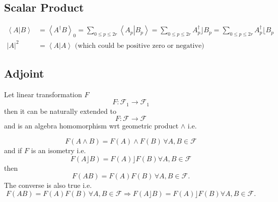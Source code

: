 \documentclass[aps,preprint]{revtex4}%
\begin{document}
\subsection{Scalar Product}%

\begin{align}
\left\langle \left.  A\right\vert B\right\rangle  &  =\left\langle A^{\dagger
}B\right\rangle _{0}=\sum_{0\leq p\leq2r}\left\langle \left.  A_{p}\right\vert
B_{p}\right\rangle =\sum_{0\leq p\leq2r}A_{p}^{\dagger}\rfloor B_{p}%
=\sum_{0\leq p\leq2r}A_{p}^{\dagger}\lfloor B_{p}\\
\left\vert A\right\vert ^{2}  &  =\left\langle \left.  A\right\vert
A\right\rangle \text{ (which could be positive zero or negative)}%
\end{align}


\subsection{Adjoint}

Let linear transformation $F$
\begin{equation}
F:\mathcal{F}_{1}\rightarrow\mathcal{F}_{1}%
\end{equation}
then it can be naturally extended to
\begin{equation}
F:\mathcal{F}\rightarrow\mathcal{F}%
\end{equation}
and is an algebra homomorphism wrt geometric product $\wedge$ i.e.%

\begin{equation}
F\left(  A\wedge B\right)  =F\left(  A\right)  \wedge F\left(  B\right)
\,\forall A,B\in\mathcal{F}%
\end{equation}
and if $F$ is an isometry i.e.
\begin{equation}
F\left(  A\rfloor B\right)  =F\left(  A\right)  \rfloor F\left(  B\right)
\forall A,B\in\mathcal{F}%
\end{equation}
then
\begin{equation}
F\left(  AB\right)  =F\left(  A\right)  F\left(  B\right)  \,\forall
A,B\in\mathcal{F}.
\end{equation}
The converse is also true i.e.
\begin{equation}
F\left(  AB\right)  =F\left(  A\right)  F\left(  B\right)  \,\forall
A,B\in\mathcal{F\Rightarrow}F\left(  A\rfloor B\right)  =F\left(  A\right)
\rfloor F\left(  B\right)  \forall A,B\in\mathcal{F}.
\end{equation}
\end{document}
